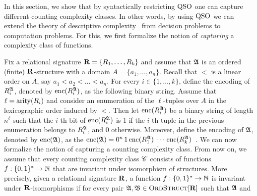 
In this section, we show that by syntactically restricting ${\rm QSO}$ one can capture different counting complexity classes. 
In other words, by using ${\rm QSO}$ we can extend the theory of descriptive complexity~\cite{immerman1999descriptive} from decision problems to computation problems. 
For this, we first formalize the notion of \emph{capturing} a complexity class of functions.

Fix a relational signature $\mathbf{R} = \{R_1, \ldots, R_k\}$ and assume that $\mathfrak{A}$ is an ordered (finite) $\mathbf{R}$-structure with a domain $A = \{a_1, \ldots, a_n\}$.
Recall that  $<$ is a linear order on $A$, say $a_1 < a_2 < \ldots < a_n$. For every $i \in \{1, \ldots, k\}$, define the encoding of $R_i^{\mathfrak{A}}$, denoted by ${\rm enc}(R_i^{\mathfrak{A}})$, as the following binary string. Assume that $\ell = {\rm arity}(R_i)$ and consider an enumeration of the $\ell$-tuples over $A$ in the lexicographic order induced by $<$. 
Then let ${\rm enc}(R_i^{\mathfrak{A}})$ be a binary string of length $n^\ell$ such that the $i$-th bit of ${\rm enc}(R_i^{\mathfrak{A}})$ is 1 if the $i$-th tuple in the previous enumeration belongs to $R_i^{\mathfrak{A}}$, and 0 otherwise. Moreover, define the encoding of $\mathfrak{A}$, denoted by ${\rm enc}(\mathfrak{A})$, as the 
${\rm enc}(\mathfrak{A}) =  0^n \, 1 \, {\rm enc}(R_1^{\mathfrak{A}}) \, \cdots \, {\rm enc}(R_k^{\mathfrak{A}})$~\cite{L04}. 
We can now formalize the notion of capturing a counting complexity class. From now on, we assume that every counting complexity class $\mathscr{C}$ consists of functions $f : \{0,1\}^* \to \mathbb{N}$ that are invariant under isomorphism of structures. More precisely, given a relational signature $\mathbf{R}$, a function $f : \{0,1\}^* \to \mathbb{N}$ is invariant under $\mathbf{R}$-isomorphisms if for every pair $\mathfrak{A}, \mathfrak{B} \in \text{\sc OrdStruct}[\mathbf{R}]$ such that $\mathfrak{A}$ and 
